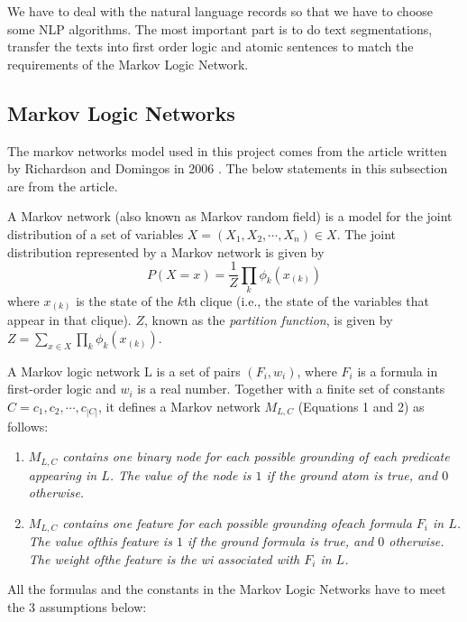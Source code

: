 \documentclass[
12pt, %
a4paper, %
oneside, %
headinclude,footinclude, %
BCOR5mm, %
]{scrartcl}
\begin{document}
We have to deal with the natural language records so that we have to choose some NLP algorithms. The most important part is to do text segmentations, transfer the texts into first order logic and atomic sentences to match the requirements of the Markov Logic Network.

\subsection{Markov Logic Networks}
The markov networks model used in this project comes from the article written by Richardson and Domingos in 2006 \cite{richardson2006markov}. The below statements in this subsection are from the article.

A Markov network (also known as Markov random field) is a model for the joint distribution of a set of variables $X = (X_1,X_2,\cdots,X_n) \in X$. The joint distribution represented by a Markov network is given by
\begin{equation}
    P(X=x)=\frac{1}{Z}\prod_k\phi_k(x_{(k)})
\end{equation}
where $x_{(k)}$ is the state of the $k$th clique (i.e., the state of the variables that appear in that clique). $Z$, known as the \textit{partition function}, is given by $Z=\sum_{x\in X}\prod_k\phi_k(x_{(k)})$.
\begin{definition}
    A Markov logic network L is a set of pairs $(F_i, w_i)$, where $F_i$ is a formula in first-order logic and $w_i$ is a real number. Together with a finite set of constants $C = {c_1,c_2,\cdots,c_{|C|}}$, it defines a Markov network $M_{L,C}$ (Equations 1 and 2) as follows:
\end{definition}

\begin{enumerate}[noitemsep]
    \item \textit{$M_{L,C}$ contains one binary node for each possible grounding of each predicate appearing in $L$. The value of the node is $1$ if the ground atom is true, and $0$ otherwise.}
    \item \textit{$M_{L,C}$ contains one feature for each possible grounding ofeach formula $F_i$ in $L$. The value ofthis feature is $1$ if the ground formula is true, and $0$ otherwise. The weight ofthe feature is the wi associated with $F_i$ in $L$.}
\end{enumerate}

All the formulas and the constants in the Markov Logic Networks have to meet the $3$ assumptions below:
\end{document}
